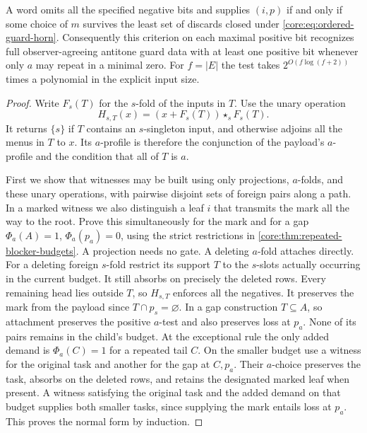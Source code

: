 \begin{theorem}
\label{core:thm:ordered-foreign-guards}
A word omits all the specified negative bits and supplies $(i,p)$
if and only if some choice of $m$ survives the least set of discards
closed under \eqref{core:eq:ordered-guard-horn}. Consequently this
criterion on each maximal positive bit recognizes full observer-agreeing
antitone guard data with at least one positive bit whenever only $a$
may repeat in a minimal zero. For $f=|E|$ the test takes
$2^{O(f\log(f+2))}$ times a polynomial in the explicit input size.
\end{theorem}
\begin{proof}
Write $F_s(T)$ for the $s$-fold of the inputs in $T$. Use the unary
operation
\[
 H_{s,T}(x)=(x+F_s(T))\star_s F_s(T).
\]
It returns $\{s\}$ if $T$ contains an $s$-singleton input, and
otherwise adjoins all the menus in $T$ to $x$. Its $a$-profile is
therefore the conjunction of the payload's $a$-profile and the
condition that all of $T$ is $a$.

First we show that witnesses may be built using only projections,
$a$-folds, and these unary operations, with pairwise disjoint sets of
foreign pairs along a path. In a marked witness we also distinguish
a leaf $i$ that transmits the mark all the way to the root. Prove
this simultaneously for the mark and for a gap $\Phi_a(A)=1$,
$\Phi_a(p_a)=0$, using the strict restrictions in
\cref{core:thm:repeated-blocker-budgets}. A projection needs no
gate. A deleting $a$-fold attaches directly. For a deleting foreign
$s$-fold restrict its support $T$ to the $s$-slots actually occurring
in the current budget. It still absorbs on precisely the deleted
rows. Every remaining head lies outside $T$, so $H_{s,T}$ enforces
all the negatives. It preserves the mark from the payload since
$T\cap p_s=\varnothing$. In a gap construction $T\subseteq A$, so
attachment preserves the positive $a$-test and also preserves loss
at $p_a$. None of its pairs remains in the child's budget.
At the exceptional rule the only added demand is $\Phi_a(C)=1$
for a repeated tail $C$. On the smaller budget use a witness for
the original task and another for the gap at $C,p_a$. Their
$a$-choice preserves the task, absorbs on the deleted rows, and
retains the designated marked leaf when present. A witness
satisfying the original task and the added demand on that budget
supplies both smaller tasks, since supplying the mark entails loss
at $p_a$. This proves the normal form by induction.


\end{proof}
